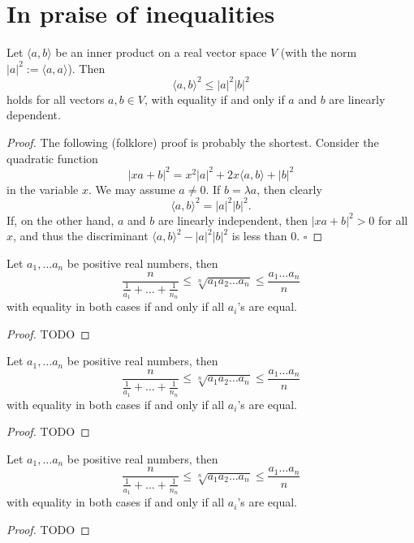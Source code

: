 \chapter{In praise of inequalities}

\begin{theorem}
  \label{ch20theoremI}
  \leanok
Let $\langle a, b \rangle$ be an inner product on a real vector space $V$ (with the norm $|a|^2 := \langle a, a \rangle$). Then
\[
\langle a, b \rangle^2 \leq |a|^2 |b|^2
\]
holds for all vectors $a, b \in V$, with equality if and only if $a$ and $b$ are linearly dependent.
\end{theorem}
\begin{proof}
  \leanok
The following (folklore) proof is probably the shortest. Consider the quadratic function
\[
|x a + b|^2 = x^2 |a|^2 + 2x \langle a, b \rangle + |b|^2
\]
in the variable $x$. We may assume $a \neq 0$. If $b = \lambda a$, then clearly
\[
\langle a, b \rangle^2 = |a|^2 |b|^2.
\]
If, on the other hand, $a$ and $b$ are linearly independent, then $|x a + b|^2 > 0$ for all $x$, and thus the discriminant $\langle a, b \rangle^2 - |a|^2 |b|^2$ is less than 0.
\(\square\)
\end{proof}

\begin{theorem}
  \label{ch20theoremIIproof1}
  Let $a_1, \dots a_n$ be positive real numbers, then
  \[
  \frac{n}{\frac{1}{a_1}+\dots+\frac{1}{n_n}} \le
    \sqrt[n]{a_1a_2\dots a_n} \le
    \frac{a_1\dots a_n}{n}
  \]
 with equality in both cases if and only if all $a_i$'s are equal.
\end{theorem}
 \begin{proof}
  TODO
\end{proof}

\begin{theorem}
  \label{ch20theoremIIproof2}
  Let $a_1, \dots a_n$ be positive real numbers, then
  \[
  \frac{n}{\frac{1}{a_1}+\dots+\frac{1}{n_n}} \le
    \sqrt[n]{a_1a_2\dots a_n} \le
    \frac{a_1\dots a_n}{n}
  \]
 with equality in both cases if and only if all $a_i$'s are equal.
\end{theorem}
 \begin{proof}
  TODO
\end{proof}

\begin{theorem}
  \label{ch20theoremIIproof3}
  Let $a_1, \dots a_n$ be positive real numbers, then
  \[
  \frac{n}{\frac{1}{a_1}+\dots+\frac{1}{n_n}} \le
    \sqrt[n]{a_1a_2\dots a_n} \le
    \frac{a_1\dots a_n}{n}
  \]
 with equality in both cases if and only if all $a_i$'s are equal.
\end{theorem}
 \begin{proof}
  TODO
\end{proof}

